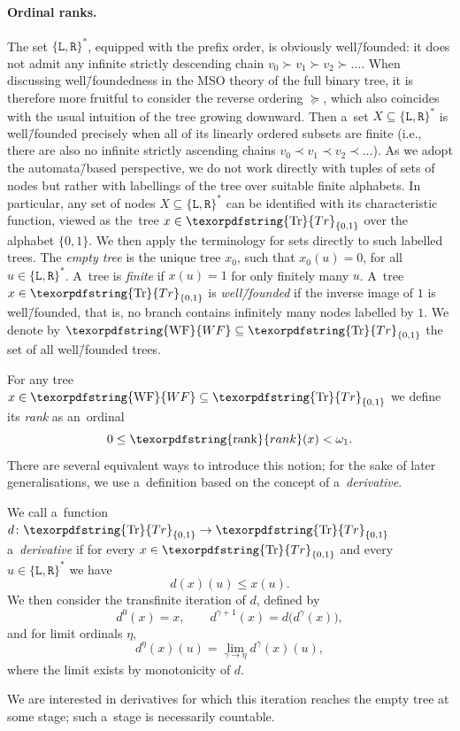 \documentclass[11pt,a4paper]{amsart}
\theoremstyle{plain}
\theoremstyle{definition}
\theoremstyle{defC}
\theoremstyle{thmC}
\theoremstyle{plain}
\numberwithin{equation}{section}
\numberwithin{equation}{section}
\numberwithin{figure}{section}
\newcommand{\ident}[1]{\ensuremath{\texorpdfstring{\mathrm{\mathnm{#1}}}{#1}}\xspace}
\newcommand{\dL}{\mathtt{{\scriptstyle L}}}
\newcommand{\dR}{\mathtt{{\scriptstyle R}}}
\newcommand{\mathnm}[1]{#1}
\newcommand{\trees}{\ident{Tr}}
\newcommand{\WF}{\ident{WF}}
\newcommand{\rank}{\ident{rank}}
\begin{document}
\paragraph*{Ordinal ranks.}
The set $\{\dL,\dR\}^\ast$,
equipped with the prefix order, is obviously well\=/founded: it does not admit any infinite strictly descending chain $v_0 \succ v_1 \succ v_2 \succ \ldots$.
When discussing well\=/foundedness in the MSO theory of the full binary tree, it is therefore more fruitful to consider the reverse ordering
$\succeq$, which also coincides with the usual intuition of the tree growing downward.
Then a~set $X \subseteq \{\dL,\dR\}^\ast$ is well\=/founded precisely when all of its linearly ordered subsets are finite
(i.e., there are also no infinite strictly ascending chains $v_0 \prec v_1 \prec v_2 \prec \ldots$).
As we adopt the automata\=/based perspective, we do not work directly with tuples of
sets of nodes but rather with labellings of the tree over suitable finite alphabets. In particular, any set of nodes
$X\subseteq \{\dL,\dR\}^\ast$ can be identified with its characteristic function, viewed as the~tree $x\in\trees_{\{0,1\}}$ over the alphabet $\{0,1\}$.
We then apply the terminology for sets directly to such labelled trees.
The \emph{empty tree} is the unique tree $x_0$, such that $x_0(u)=0$, for all $u\in\{\dL,\dR\}^\ast$.
A~tree is \emph{finite} if $x(u)=1$ for only finitely many $u$.
A~tree $x\in\trees_{\{0,1\}}$ is \emph{well\=/founded} if the inverse image of $1$ is well\=/founded, that is, no branch contains infinitely many nodes labelled by $1$.
We denote by $\WF\subseteq\trees_{\{0,1\}}$ the
set of all well\=/founded trees.

For any tree $x \in \WF \subseteq \trees_{\{0,1\}}$ we define its \emph{rank} as an~ordinal
\[ 0 \leq \rank(x) < \omega_1. \]
There are several equivalent ways to introduce this notion; for the sake of later generalisations, we use a~definition based on the concept of a~\emph{derivative}.

We call a~function $d \colon \trees_{\{0,1\}} \to \trees_{\{0,1\}}$ a~\emph{derivative} if for every $x \in \trees_{\{0,1\}}$ and every $u \in \{\dL,\dR\}^\ast$ we have
\[ d(x)(u) \leq x(u). \]
We then consider the transfinite iteration of $d$, defined by
\[
d^0(x) = x,\qquad
d^{\gamma+1}(x) = d\bigl(d^\gamma(x)\bigr),
\]
and for limit ordinals $\eta$,
\[
d^\eta(x)(u) = \lim_{\gamma \to \eta} d^\gamma(x)(u),
\]
where the limit exists by monotonicity of $d$.

We are interested in derivatives for which this iteration reaches the empty tree at some stage; such a~stage is necessarily countable.
\end{document}
